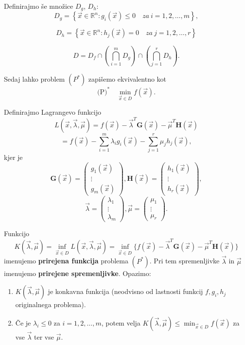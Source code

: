 \documentclass{article}
\begin{document}
\begin{multicols}{2}
	Definirajmo še množice \( D_g \), \( D_h \):
	\[
		D_g = \left\{ \vec{x} \in \mathbb{R}^n : g_i(\vec{x}) \leq 0 \quad za \ i = 1,2,\ldots,m \right\},
	\]

	\[
		D_h = \left\{ \vec{x} \in \mathbb{R}^n : h_j(\vec{x}) = 0 \quad za \ j = 1,2,\ldots,r \right\}
	\]

	\[
		D = D_f \cap \left( \bigcap_{i=1}^m D_g \right) \cap \left( \bigcap_{j=1}^r D_h \right).
	\]

	Sedaj lahko problem \( (P^*) \) zapišemo ekvivalentno kot
	\[
		\text{(P)}^* \quad \min_{\vec{x} \in D} f(\vec{x}).
	\]

	Definirajmo Lagrangevo funkcijo
	\[
		L(\vec{x}, \vec{\lambda}, \vec{\mu}) = f(\vec{x}) - \vec{\lambda}^T \mathbf{G}(\vec{x}) - \vec{\mu}^T \mathbf{H}(\vec{x})
	\]
	\[
		= f(\vec{x}) - \sum_{i=1}^{m} \lambda_i g_i(\vec{x}) - \sum_{j=1}^{r} \mu_j h_j(\vec{x}),
	\]
	kjer je
	\[
		\mathbf{G}(\vec{x}) =
		\begin{pmatrix}
			g_1(\vec{x}) \\
			\vdots       \\
			g_m(\vec{x})
		\end{pmatrix},
		\mathbf{H}(\vec{x}) =
		\begin{pmatrix}
			h_1(\vec{x}) \\
			\vdots       \\
			h_r(\vec{x})
		\end{pmatrix},
	\]
	\[
		\vec{\lambda} =
		\begin{pmatrix}
			\lambda_1 \\
			\vdots    \\
			\lambda_m
		\end{pmatrix},
		\vec{\mu} =
		\begin{pmatrix}
			\mu_1  \\
			\vdots \\
			\mu_r
		\end{pmatrix}.
	\]

	Funkcijo
	\[
		K(\vec{\lambda}, \vec{\mu}) = \inf_{\vec{x} \in D} L(\vec{x}, \vec{\lambda}, \vec{\mu}) = \inf_{\vec{x} \in D} \{ f(\vec{x}) - \vec{\lambda}^T \mathbf{G}(\vec{x}) - \vec{\mu}^T \mathbf{H}(\vec{x}) \}
	\]
	imenujemo \textbf{prirejena funkcija} problema  $(P^*) $. Pri tem spremenljivke $ \vec{\lambda} $ in $ \vec{\mu} $ imenujemo \textbf{prirejene spremenljivke}. Opazimo:

	\begin{enumerate}
		\item \( K(\vec{\lambda}, \vec{\mu}) \) je konkavna funkcija (neodvisno od lastnosti funkcij \( f, g_i, h_j \) originalnega problema).
		\item Če je \( \lambda_i \leq 0 \) za \( i = 1,2,\ldots,m \), potem velja \( K(\vec{\lambda}, \vec{\mu}) \leq \min_{\vec{x} \in D} f(\vec{x}) \) za vse \( \vec{\lambda} \) ter vse \( \vec{\mu} \).
	\end{enumerate}



\end{multicols}
\end{document}
